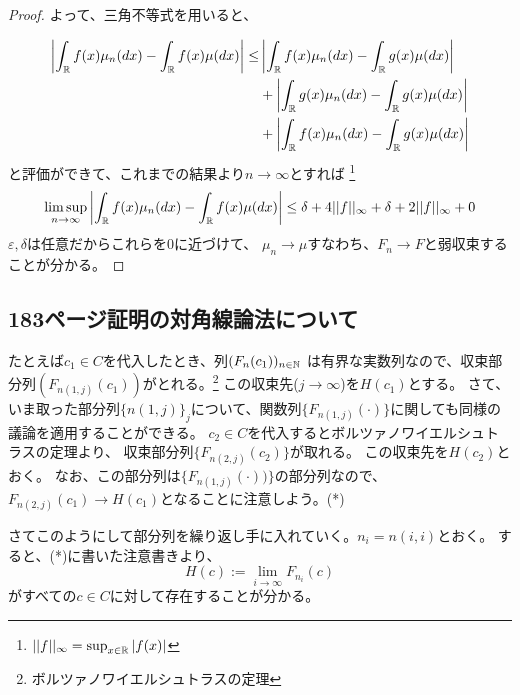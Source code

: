 \begin{proof}
      よって、三角不等式を用いると、

      \begin{align*}
        \left| \int_{{\mathbb{R}}} f(x)\mu_n(dx) - \int_{{\mathbb{R}}} f(x)\mu(dx)\right| \leq & \left| \int_{{\mathbb{R}}} f(x)\mu_n(dx) - \int_{{\mathbb{R}}} g(x)\mu(dx)\right|\\
        & + \left| \int_{{\mathbb{R}}} g(x)\mu_n(dx) - \int_{{\mathbb{R}}} g(x)\mu(dx)\right|\\
        & + \left| \int_{{\mathbb{R}}} f(x)\mu_n(dx) - \int_{{\mathbb{R}}} g(x)\mu(dx)\right|
      \end{align*}
      と評価ができて、これまでの結果より$n \longrightarrow \infty$とすれば
      \footnote{$||f||_{\infty} = \sup_{x \in {\mathbb{R}}}|f(x)|$}
      \[
        \limsup_{n \to \infty} \left| \int_{{\mathbb{R}}} f(x)\mu_n(dx) - \int_{{\mathbb{R}}} f(x)\mu(dx)\right| \leq \delta  + 4||f||_{\infty} + \delta  + 2||f||_{\infty} + 0
      \]
      $\varepsilon, \delta$は任意だからこれらを$0$に近づけて、
      $\mu_n \longrightarrow \mu$すなわち、$F_n \longrightarrow F$と弱収束することが分かる。
    \end{proof}

  \subsection{183ページ証明の対角線論法について}
    たとえば$c_1 \in C$を代入したとき、列$(F_n(c_1))_{n \in {\mathbb{N}}}$
    は有界な実数列なので、収束部分列$(F_{n(1,j)}(c_1))$がとれる。\footnote{ボルツァノワイエルシュトラスの定理}
    この収束先($j \longrightarrow \infty$)を$H(c_1)$とする。
    さて、いま取った部分列$\{n(1,j)\}_j$について、関数列$\{ F_{n(1,j)}(\cdot)\}$に関しても同様の議論を適用することができる。
    $c_2 \in C$を代入するとボルツァノワイエルシュトラスの定理より、
    収束部分列$\{ F_{n(2,j)}(c_2) \}$が取れる。
    この収束先を$H(c_2)$とおく。
    なお、この部分列は$\{ F_{n(1,j)}(\cdot)) \}$の部分列なので、
    $F_{n(2,j)}(c_1) \longrightarrow H(c_1)$となることに注意しよう。(*)

    さてこのようにして部分列を繰り返し手に入れていく。$n_i = n(i,i)$とおく。
    すると、(*)に書いた注意書きより、
    \[
      H(c) := \lim_{i \to \infty}F_{n_i}(c)
    \]
    がすべての$c \in C$に対して存在することが分かる。

